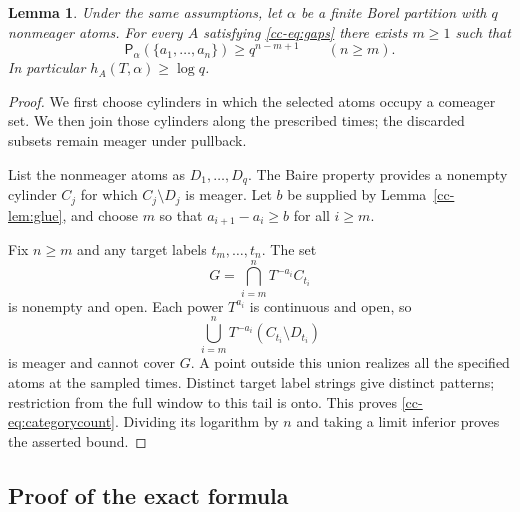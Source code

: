 \documentclass[11pt,reqno]{amsart}
\numberwithin{equation}{section}
\newtheorem{lemma}[theorem]{Lemma}
\theoremstyle{definition}
\theoremstyle{definition}
\newcommand{\Patt}{\mathsf P}
\begin{document}
\begin{lemma}\label{cc-lem:borel}
Under the same assumptions, let $\alpha$ be a finite Borel partition
with $q$ nonmeager atoms. For every $A$ satisfying \eqref{cc-eq:gaps} there
exists $m\ge1$ such that
\begin{equation}\label{cc-eq:categorycount}
 \Patt_\alpha(\{a_1,\ldots,a_n\})\ge q^{n-m+1}\qquad(n\ge m).
\end{equation}
In particular $h_A(T,\alpha)\ge\log q$.
\end{lemma}
\begin{proof}
We first choose cylinders in which the selected atoms occupy a
comeager set. We then join those cylinders along the prescribed times;
the discarded subsets remain meager under pullback.

List the nonmeager atoms as $D_1,\ldots,D_q$. The Baire property
provides a nonempty cylinder $C_j$ for which $C_j\setminus D_j$ is
meager. Let $b$ be supplied by Lemma~\ref{cc-lem:glue}, and choose $m$ so
that $a_{i+1}-a_i\ge b$ for all $i\ge m$.

Fix $n\ge m$ and any target labels $t_m,\ldots,t_n$. The set
\[
 G=\bigcap_{i=m}^n T^{-a_i}C_{t_i}
\]
is nonempty and open. Each power $T^{a_i}$ is continuous and open, so
\[
 \bigcup_{i=m}^n T^{-a_i}(C_{t_i}\setminus D_{t_i})
\]
is meager and cannot cover $G$. A point outside this union realizes
all the specified atoms at the sampled times. Distinct target label
strings give distinct patterns; restriction from the full window to
this tail is onto. This proves \eqref{cc-eq:categorycount}. Dividing its
logarithm by $n$ and taking a limit inferior proves the asserted bound.
\end{proof}

\subsection{Proof of the exact formula}
\end{document}
